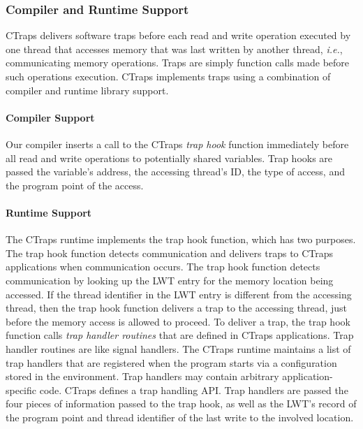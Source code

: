 \documentclass[pageno,nohyperref]{jpaper}
\newcommand{\ctraps}{CTraps\xspace}
\newcommand{\lwt}{LWT\xspace}
\newcommand{\Caption}[1]{\begin{minipage}{.95\columnwidth} \caption{#1} \end{minipage} \vspace{-1.2ex}}
\begin{document}
\subsubsection{Compiler and Runtime Support} 

\ctraps delivers software traps before each read and write operation executed
by one thread that accesses memory that was last written by another
thread, {\em i.e.}, communicating memory operations.  Traps are 
simply function calls made before such operations
execution.  \ctraps implements traps using a combination of compiler and
runtime library support.   

\paragraph{Compiler Support} Our compiler inserts a call to the CTraps {\em
trap hook} function immediately before all read and write operations to
potentially shared variables.  Trap hooks are passed the variable's address,
the accessing thread's ID, the type of access, and the program point of the
access.  

\paragraph{Runtime Support}
The \ctraps runtime implements the trap hook function,  which has two purposes.
The trap hook function detects communication and delivers traps to \ctraps
applications when communication occurs.  The trap hook function detects
communication by looking up the \lwt entry for the memory location being
accessed.  If the thread identifier in the \lwt entry is different from the
accessing thread, then the trap hook function delivers a trap to the accessing
thread, just before the memory access is allowed to proceed.  To deliver a
trap, the trap hook function calls {\em trap handler routines} that are defined
in \ctraps applications.  Trap handler routines are like signal handlers.  The
\ctraps runtime maintains a list of trap handlers that are registered when the
program starts via a configuration stored in the environment.  Trap handlers
may contain arbitrary application-specific code.  \ctraps defines a trap
handling API.  Trap handlers are passed the four pieces of information passed
to the trap hook, as well as the \lwt's record of the program point and thread
identifier of the last write to the involved location.

\end{document}
